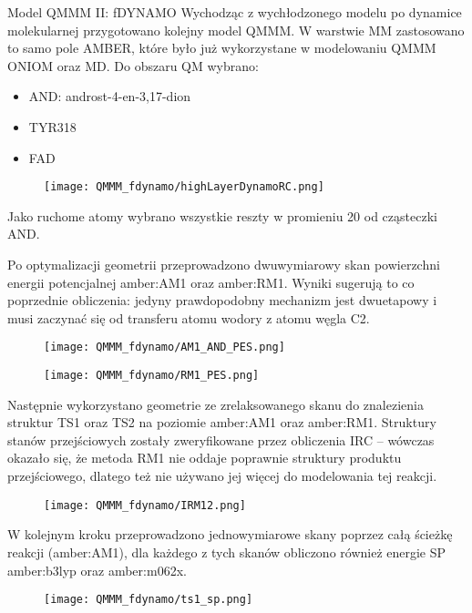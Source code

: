\begin{section}{Model QMMM II: fDYNAMO}
Wychodząc z wychłodzonego modelu po dynamice molekularnej przygotowano kolejny model QMMM. W warstwie MM zastosowano to samo pole AMBER, które było już wykorzystane
w modelowaniu QMMM ONIOM oraz MD. Do obszaru QM wybrano:

\begin{itemize}
 \item AND: androst-4-en-3,17-dion
 \item TYR318
 \item FAD
\end{itemize}


 \begin{figure}[H]
  \texttt{[image: QMMM\_fdynamo/highLayerDynamoRC.png]}
\end{figure}

Jako ruchome atomy wybrano wszystkie reszty w promieniu 20 \angstrom od cząsteczki AND.

Po optymalizacji geometrii przeprowadzono dwuwymiarowy skan powierzchni energii potencjalnej amber:AM1 oraz amber:RM1. Wyniki sugerują to co poprzednie obliczenia: jedyny
prawdopodobny mechanizm  jest dwuetapowy i musi zaczynać się od transferu atomu wodory z atomu węgla C2.

 \begin{figure}[H]
  \texttt{[image: QMMM\_fdynamo/AM1\_AND\_PES.png]}
\end{figure}

 \begin{figure}[H]
  \texttt{[image: QMMM\_fdynamo/RM1\_PES.png]}
\end{figure}

Następnie wykorzystano geometrie ze zrelaksowanego skanu do znalezienia struktur TS1 oraz TS2 na poziomie amber:AM1 oraz amber:RM1. Struktury stanów przejściowych zostały zweryfikowane
przez obliczenia IRC -- wówczas okazało się, że metoda RM1 nie oddaje poprawnie struktury produktu przejściowego, dlatego też nie używano jej więcej do modelowania tej reakcji.

 \begin{figure}[H]
  \texttt{[image: QMMM\_fdynamo/IRM12.png]}
\end{figure}


W kolejnym kroku przeprowadzono jednowymiarowe skany poprzez całą ścieżkę reakcji (amber:AM1), dla każdego z tych skanów obliczono również energie SP amber:b3lyp oraz amber:m062x.
 \begin{figure}[H]
  \texttt{[image: QMMM\_fdynamo/ts1\_sp.png]}
\end{figure}


\end{section}
